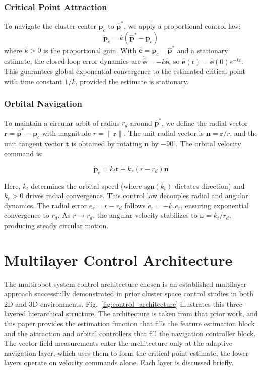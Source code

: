 \documentclass[lettersize,journal]{IEEEtran}
\begin{document}
\subsubsection{Critical Point Attraction}
To navigate the cluster center $\mathbf{p}_c$ to $\hat{\mathbf{p}}^*$, we apply a proportional control law:
\begin{equation}\label{eq:10}
\dot{\mathbf{p}}_c = k(\hat{\mathbf{p}}^* - \mathbf{p}_c)
\end{equation}
where $k > 0$ is the proportional gain. With $\hat{\mathbf{e}} = \mathbf{p}_c - \hat{\mathbf{p}}^*$ and a stationary estimate, the closed-loop error dynamics are $\dot{\hat{\mathbf{e}}} = -k\hat{\mathbf{e}}$, so $\hat{\mathbf{e}}(t) = \hat{\mathbf{e}}(0)e^{-kt}$. This guarantees global exponential convergence to the estimated critical point with time constant $1/k$, provided the estimate is stationary.

\subsubsection{Orbital Navigation}
To maintain a circular orbit of radius $r_d$ around $\hat{\mathbf{p}}^*$, we define the radial vector $\mathbf{r} = \hat{\mathbf{p}}^* - \mathbf{p}_c$ with magnitude $r = \|\mathbf{r}\|$. The unit radial vector is $\mathbf{n} = \mathbf{r}/r$, and the unit tangent vector $\mathbf{t}$ is obtained by rotating $\mathbf{n}$ by $-90^\circ$. The orbital velocity command is:

\begin{equation}\label{eq:11}
\dot{\mathbf{p}}_c = k_t \mathbf{t} + k_r(r - r_d)\mathbf{n}
\end{equation}

Here, $k_t$ determines the orbital speed (where $\text{sgn}(k_t)$ dictates direction) and $k_r > 0$ drives radial convergence.
This control law decouples radial and angular dynamics. The radial error $e_r = r - r_d$ follows $\dot{e}_r = -k_r e_r$, ensuring exponential convergence to $r_d$. As $r \to r_d$, the angular velocity stabilizes to $\omega = k_t/r_d$, producing steady circular motion.

\section{Multilayer Control Architecture}


The multirobot system control architecture chosen is an established multilayer approach successfully demonstrated in prior cluster space control studies in both 2D \cite{5,8,10} and 3D \cite{7,9} environments. Fig.~\ref{fig:control_architecture} illustrates this three-layered hierarchical structure. The architecture is taken from that prior work, and this paper provides the estimation function that fills the feature estimation block and the attraction and orbital controllers that fill the navigation controller block. The vector field measurements enter the architecture only at the adaptive navigation layer, which uses them to form the critical point estimate; the lower layers operate on velocity commands alone. Each layer is discussed briefly.
\end{document}
